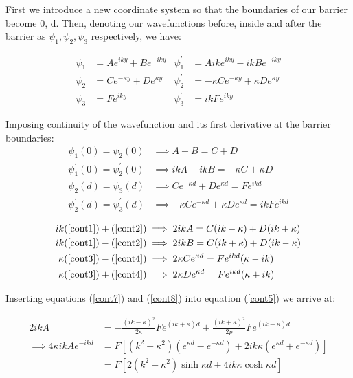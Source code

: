 \documentclass{article}
\begin{document}
First we introduce a new coordinate system so that the boundaries of our barrier become 0, d. Then, denoting our wavefunctions before, inside and after the barrier as $\psi_{1}, \psi_{2}, \psi_{3}$ respectively, we have:

\begin{align}
	\psi_{1} &= Ae^{iky} + Be^{-iky} & \psi_{1}^{'} &= Aike^{iky} - ikBe^{-iky} \\
	\psi_{2} &= Ce^{-\kappa y} + De^{\kappa y} & \psi_{2}^{'} &= -\kappa Ce^{-\kappa y} + \kappa De^{\kappa y} \\
	\psi_{3} &= Fe^{iky} & \psi_{3}^{'} &= ikFe^{iky}
\end{align}

Imposing continuity of the wavefunction and its first derivative at the barrier boundaries:
\begin{align}
	\psi_{1}(0) = \psi_{2}(0) &\implies A+B = C+D \label{cont1}\\
	\psi_{1}^{'}(0) = \psi_{2}^{'}(0) &\implies ikA - ikB = -\kappa C + \kappa D \label{cont2}\\
	\psi_{2}(d) = \psi_{3}(d) &\implies Ce^{-\kappa d} + De^{\kappa d} = Fe^{ikd} \label{cont3}\\
	\psi_{2}^{'}(d) = \psi_{3}^{'}(d) &\implies -\kappa Ce^{-\kappa d} + \kappa De^{\kappa d} = ikF e^{ikd} \label{cont4}
\end{align}

\begin{align}
	ik(\ref{cont1})+(\ref{cont2}) &\implies 2ikA = C(ik-\kappa)+D(ik+\kappa) \label{cont5}\\
	ik(\ref{cont1})-(\ref{cont2}) &\implies 2ikB = C(ik+\kappa)+D(ik-\kappa) \label{cont6}\\
	\kappa(\ref{cont3})-(\ref{cont4}) &\implies 2\kappa Ce^{\kappa d} = Fe^{ikd}(\kappa-ik) \label{cont7}\\
	\kappa(\ref{cont3})+(\ref{cont4}) &\implies 2\kappa De^{\kappa d} = Fe^{ikd}(\kappa+ik) \label{cont8}
\end{align}

Inserting equations (\ref{cont7}) and (\ref{cont8}) into equation (\ref{cont5}) we arrive at:

\begin{align}
	2ikA &= -\frac{(ik-\kappa)^2}{2\kappa}Fe^{(ik+\kappa)d}+\frac{(ik+\kappa)^2}{2p}Fe^{(ik-\kappa)d} \label{cont9} \\
	\implies 4\kappa ikAe^{-ikd} &= F[(k^2-\kappa^2)(e^{\kappa d}-e^{-\kappa d})+2ik\kappa(e^{\kappa d}+e^{-\kappa d})] \label{cont10}\\
				     &= F[2(k^2-\kappa^2)\sinh{\kappa d}+4ik\kappa \cosh{\kappa d}] \label{cont11}
\end{align}
\end{document}
